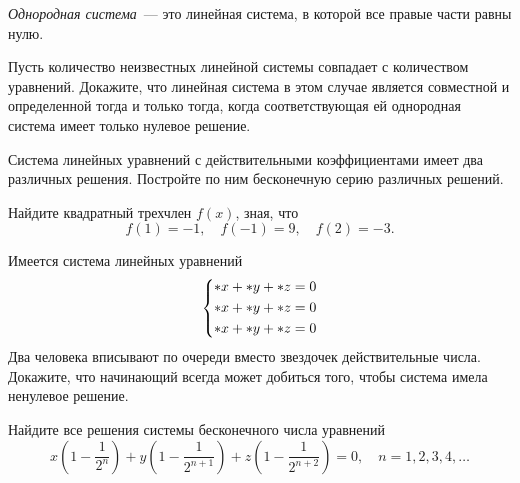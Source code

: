 \emph{Однородная система}~--- это линейная система, в которой все правые части
равны нулю.

\begin{problems}

\item
Пусть количество неизвестных линейной системы совпадает с количеством
уравнений.
Докажите, что линейная система в этом случае является совместной и определенной
тогда и только тогда, когда соответствующая ей однородная система имеет только
нулевое решение.

\item
Система линейных уравнений с действительными коэффициентами имеет два различных
решения.
Постройте по ним бесконечную серию различных решений.

\item
Найдите квадратный трехчлен $f(x)$, зная, что
\[
    f(1) = -1
,\quad
    f(-1) = 9
,\quad
    f(2) = -3
.\]

\item
Имеется система линейных уравнений
\[ \def\star{\mathord{\ast}}
\left\{\begin{aligned} &
    \star x + \star y + \star z = 0
\\ &
    \star x + \star y + \star z = 0
\\ &
    \star x + \star y + \star z = 0
\end{aligned}\right.\]
Два человека вписывают по очереди вместо звездочек действительные числа.
Докажите, что начинающий всегда может добиться того, чтобы система имела
ненулевое решение.

\item
Найдите все решения системы бесконечного числа уравнений
\[
    x \left( 1 - \frac{1}{2^n} \right)
    +
    y \left( 1 - \frac{1}{2^{n+1}} \right)
    +
    z \left( 1 - \frac{1}{2^{n+2}} \right)
=
    0
,\quad
    n = 1, 2, 3, 4, \ldots
\]

\end{problems}

